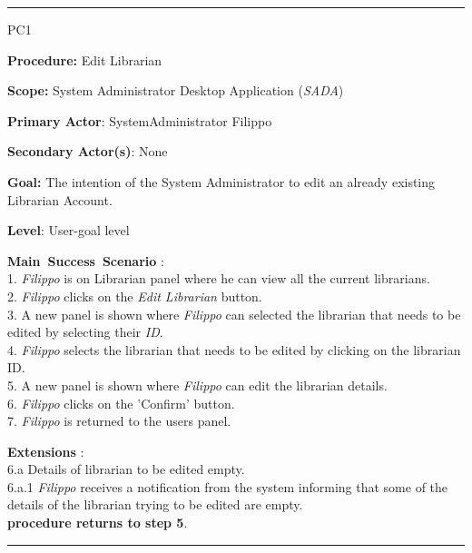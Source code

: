 \vspace{0.5cm}
\hrule
\begin{lyxlist}{PC1}
\small{
\item [\textbf{Procedure:}] Edit Librarian
\item [\textbf{Scope:}] System Administrator Desktop Application (\emph{SADA})
\item [\textbf{Primary Actor}:] SystemAdministrator Filippo
\item [\textbf{Secondary Actor(s)}:] None
\item [\textbf{Goal:}] The intention of the System Administrator to
edit an already existing Librarian Account.
\item [\textbf{Level}:] User-goal level
\item [\textbf{Main~Success~Scenario}]:\\
1. \emph{Filippo} is on Librarian panel where he can view all the current
librarians.
\\
2. \emph{Filippo} clicks on the \emph{Edit Librarian} button. \\
3. A new panel is shown where \emph{Filippo} can selected the librarian
that needs to be edited by selecting their \emph{ID}.
\\
4. \emph{Filippo} selects the librarian that needs to be edited by clicking on
the librarian ID. \\ 
5. A new panel is shown where \emph{Filippo} can edit
the librarian details. \\
6. \emph{Filippo} clicks on the 'Confirm' button. \\
7. \emph{Filippo} is returned to the users panel. \\



\item [\textbf{Extensions}]: \\
6.a Details of librarian to be edited empty.\\
\hspace*{0.5cm} 6.a.1 \emph{Filippo} receives a notification from
the system informing that some of the details of the librarian trying to be
edited are empty. \\
\hspace*{0.5cm} \textbf{procedure returns to step 5}.\\
}
\end{lyxlist}
\hrule


